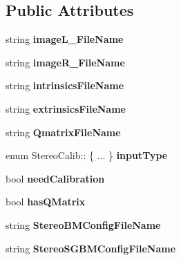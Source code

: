\subsection*{Public Attributes}
\begin{DoxyCompactItemize}
\item 
string {\bfseries image\+L\+\_\+\+File\+Name}\hypertarget{class_stereo_calib_ab3170ca0cdb6d029819cb3ffb4ccbb5b}{}\label{class_stereo_calib_ab3170ca0cdb6d029819cb3ffb4ccbb5b}

\item 
string {\bfseries image\+R\+\_\+\+File\+Name}\hypertarget{class_stereo_calib_aa881b7be6b75603581c58557e71a5212}{}\label{class_stereo_calib_aa881b7be6b75603581c58557e71a5212}

\item 
string {\bfseries intrinsics\+File\+Name}\hypertarget{class_stereo_calib_a0de8ba0185de07f46378fcca016923a2}{}\label{class_stereo_calib_a0de8ba0185de07f46378fcca016923a2}

\item 
string {\bfseries extrinsics\+File\+Name}\hypertarget{class_stereo_calib_a477840f6804f140fccdc0af4eb820144}{}\label{class_stereo_calib_a477840f6804f140fccdc0af4eb820144}

\item 
string {\bfseries Qmatrix\+File\+Name}\hypertarget{class_stereo_calib_a417c313faa6f3aed0193fe023da8faf9}{}\label{class_stereo_calib_a417c313faa6f3aed0193fe023da8faf9}

\item 
enum Stereo\+Calib\+:: \{ ... \}  {\bfseries input\+Type}\hypertarget{class_stereo_calib_adf965991ec0d973fe7ceac3d62e45d98}{}\label{class_stereo_calib_adf965991ec0d973fe7ceac3d62e45d98}

\item 
bool {\bfseries need\+Calibration}\hypertarget{class_stereo_calib_a9eb8ec0523950dc79930ca6c4f8d769d}{}\label{class_stereo_calib_a9eb8ec0523950dc79930ca6c4f8d769d}

\item 
bool {\bfseries has\+Q\+Matrix}\hypertarget{class_stereo_calib_aef06d162b6f5638181de3d81a51680de}{}\label{class_stereo_calib_aef06d162b6f5638181de3d81a51680de}

\item 
string {\bfseries Stereo\+B\+M\+Config\+File\+Name}\hypertarget{class_stereo_calib_ad8c790edd320cc7c0c8d99f3290d9934}{}\label{class_stereo_calib_ad8c790edd320cc7c0c8d99f3290d9934}

\item 
string {\bfseries Stereo\+S\+G\+B\+M\+Config\+File\+Name}\hypertarget{class_stereo_calib_ab39bf50aa2351d803c4f0c3587bc8f85}{}\label{class_stereo_calib_ab39bf50aa2351d803c4f0c3587bc8f85}


\end{DoxyCompactItemize}
